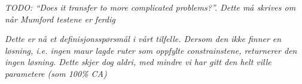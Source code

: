 \emph{\color{blue} TODO: ``Does it transfer to more complicated problems?''. Dette må skrives om når Mumford testene er ferdig}


\emph{\color{blue} Dette er nå et definisjonsspørsmål i vårt tilfelle. Dersom den ikke finner en løsning, i.e. ingen maur lagde ruter som oppfylte constrainstene, returnerer den ingen løsning. Dette skjer dog aldri, med mindre vi har gitt den helt ville parametere (som 100\% CA)}


